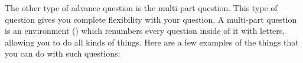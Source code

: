 \documentclass{siproblemset}
\begin{document}
    \begin{multipartquestion}
        The other type of advance question is the multi-part question. This type of question gives you complete flexibility with your question. A multi-part question is an environment \linebreak() which renumbers every question inside of it with letters, allowing you to do all kinds of things.
        \tinysp
        \newpage
        \tinysp
        Here are a few examples of the things that you can do with such questions:
    \end{multipartquestion}
    
\end{document}
